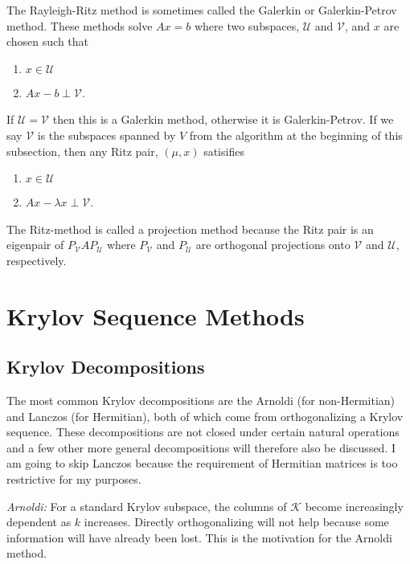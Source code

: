 \documentclass[12pt,twoside]{article}
\newcommand{\cl}[1]{\ensuremath{\mathcal{#1}}}
\newcommand{\epair}{eigenpair }
\begin{document}
The Rayleigh-Ritz method is sometimes called the Galerkin or Galerkin-Petrov method. These methods solve $Ax = b$ where two subspaces, $\cl{U}$ and $\cl{V}$, and $x$ are chosen such that 
\begin{enumerate}
  \item $x \in \cl{U}$
  \item $Ax - b \perp \cl{V}$.
\end{enumerate}
If $\cl{U} = \cl{V}$ then this is a Galerkin method, otherwise it is Galerkin-Petrov. If we say $\cl{V}$ is the subspaces spanned by $V$ from the algorithm at the beginning of this subsection, then any Ritz pair, $(\mu, x)$ satisifies
\begin{enumerate}
  \item $x \in \cl{U}$
  \item $Ax - \lambda x \perp \cl{V}$.
\end{enumerate}
The Ritz-method is called a projection method because the Ritz pair is an \epair of $P_\cl{V}AP_\cl{U}$ where $P_\cl{V}$ and $P_\cl{U}$ are orthogonal projections onto $\cl{V}$ and $\cl{U}$, respectively. 

\section{Krylov Sequence Methods}
\subsection{Krylov Decompositions}
The most common Krylov decompositions are the Arnoldi (for non-Hermitian) and Lanczos (for Hermitian), both of which come from orthogonalizing a Krylov sequence. These decompositions are not closed under certain natural operations and a few other more general decompositions will therefore also be discussed. I am going to skip Lanczos because the requirement of Hermitian matrices is too restrictive for my purposes. 

\emph{Arnoldi:} For a standard Krylov subspace, the columns of \cl{K} become increasingly dependent as $k$ increases. Directly orthogonalizing will not help because some information will have already been lost. This is the motivation for the Arnoldi method. 
\end{document}
